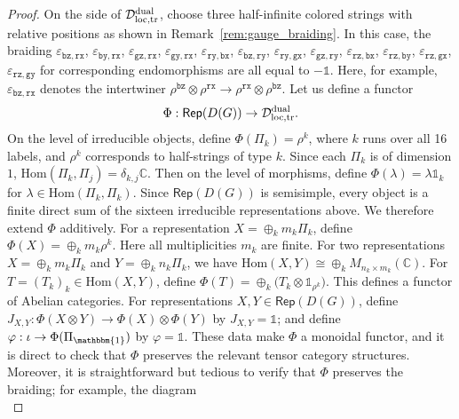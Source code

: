 \documentclass[a4paper,11pt]{article}
\theoremstyle{definition}
\theoremstyle{remark}
\theoremstyle{remark}
\newcommand\Rep {\mathsf{Rep}}
\newcommand\End {\mathrm{End}}
\newcommand\Hom {\mathrm{Hom}}
\newcommand{\one}{\mathbbm{1}}
\begin{document}
\begin{proof}
    On the side of $\mathcal{D}_{\rm loc, tr}^{\rm dual}$, choose three half-infinite colored strings with relative positions as shown in Remark~\ref{rem:gauge_braiding}. 
    In this case,  the braiding $\varepsilon_{\mathtt{bz},\mathtt{rx}}$, $\varepsilon_{\mathtt{by},\mathtt{rx}}$, $\varepsilon_{\mathtt{gz},\mathtt{rx}}$, $\varepsilon_{\mathtt{gy},\mathtt{rx}}$, $\varepsilon_{\mathtt{ry},\mathtt{bx}}$, $\varepsilon_{\mathtt{bz},\mathtt{ry}}$, $\varepsilon_{\mathtt{ry},\mathtt{gx}}$, $\varepsilon_{\mathtt{gz},\mathtt{ry}}$, $\varepsilon_{\mathtt{rz},\mathtt{bx}}$, $\varepsilon_{\mathtt{rz},\mathtt{by}}$, $\varepsilon_{\mathtt{rz},\mathtt{gx}}$, 
    $\varepsilon_{\mathtt{rz},\mathtt{gy}}$ for corresponding endomorphisms are all equal to $-\mathds{1}$. 
    Here, for example, $\varepsilon_{\mathtt{bz},\mathtt{rx}}$ denotes the intertwiner $\rho^{\mathtt{bz}}\otimes \rho^{\mathtt{rx}} \to \rho^{\mathtt{rx}}\otimes \rho^{\mathtt{bz}}$.
    Let us define a functor 
    \[
        \Phi:\Rep(D(G)) \to \mathcal{D}_{\rm loc, tr}^{\rm dual}. 
    \]
    On the level of irreducible objects, define $\Phi(\Pi_k) = \rho^k$, where $k$ runs over all 16 labels, and $\rho^k$ corresponds to half-strings of type $k$. 
    Since each $\Pi_k$ is of dimension $1$, $\Hom(\Pi_k,\Pi_j) = \delta_{k,j}\mathbb{C}$. 
    Then on the level of morphisms, define $\Phi(\lambda) = \lambda\mathds{1}_k$ for $\lambda\in \Hom(\Pi_k,\Pi_k)$. 
    Since $\Rep(D(G))$ is semisimple, every object is a finite direct sum of the sixteen irreducible representations above. We therefore extend $\Phi$ additively. 
    For a representation $X = \oplus_k m_k\Pi_k$, define $\Phi(X) = \oplus_k m_k\rho^k$. Here all multiplicities $m_k$ are finite. For two representations $X=\oplus_k m_k\Pi_k$ and $Y= \oplus_k n_k\Pi_k$, we have $\Hom(X,Y) \cong \oplus_k M_{n_k\times m_k}(\mathbb C)$. 
    For $T=(T_k)_k\in\Hom(X,Y)$, 
    define $\Phi(T)=\oplus_k\bigl(T_k\otimes\mathds{1}_{\rho^k}\bigr)$.  
    This defines a functor of Abelian categories. 
    For representations $X,Y\in \Rep(D(G))$, define $J_{X,Y}:\Phi(X\otimes Y) \to \Phi(X)\otimes \Phi(Y)$ by $J_{X,Y}=\mathds{1}$; and define $\varphi:\iota \to \Phi(\Pi_{\one})$ by $\varphi = \mathds{1}$. 
    These data make $\Phi$ a monoidal functor, and it is direct to check that $\Phi$ preserves the relevant tensor category structures. 
    Moreover, it is straightforward but tedious to verify that $\Phi$ preserves the braiding; for example, the diagram
    \begin{equation*}

\end{equation*}
\end{proof}
\end{document}
